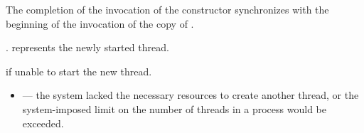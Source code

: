 \begin{itemdescr}
\pnum\sync The completion of the invocation of the constructor
synchronizes with the beginning of the invocation of the copy of .

\pnum\postconditions {}.  represents the newly started thread.

\pnum\throws {} if unable to start the new thread.

\pnum\errors
\begin{itemize}
\item {} --- the system lacked the necessary
resources to create another thread, or the system-imposed limit on the number of
threads in a process would be exceeded.
\end{itemize}
\end{itemdescr}


\clearpage

